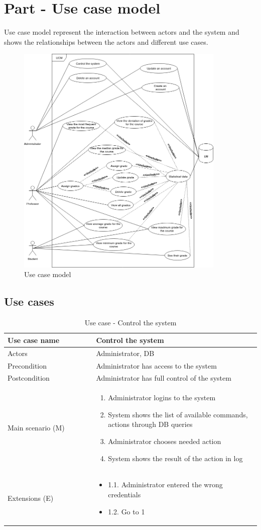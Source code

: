 \documentclass[12pt]{article}
\newcommand\tabularhead[1]{
\begin{table}[h]
  \caption{Use case - #1}
  \begin{tabular}{|p{0.35\linewidth}|p{0.65\linewidth}|}
    \hline
    \textbf{Use case name} & \textbf{#1} \\
    \hline}
\newcommand\addrow[2]{#1 &#2\\ \hline}
\newcommand\adddoublerow[2]{\begin{minipage}[t][][t]{2.5cm}#1\end{minipage}%
    &\begin{minipage}[t][][t]{\linewidth}
     \begin{itemize}\setlength{\itemsep}{0pt}%
        #2     
     \end{itemize}
     \end{minipage}\\ \hline}
\newcommand\addmulrow[2]{ \begin{minipage}[t][][t]{2.5cm}#1\end{minipage}%
     &\begin{minipage}[t][][t]{\linewidth}
      \begin{enumerate}\setlength{\itemsep}{0pt}%
        #2   
      \end{enumerate}
      \end{minipage}\\ \hline}
\newenvironment{usecase}{\tabularhead}
{\hline\end{tabular}\end{table}}
\begin{document}
\section{Part - Use case model}
Use case model represent the interaction between actors and the system and shows the relationships between the actors and different use cases.\cite{UCM}
\begin{figure}[h]
\centering
\includegraphics[width=0.89\textwidth]{UCM.png}
\caption{Use case model}
\end{figure}
\newpage
\subsection{Use cases}

\begin{usecase}{Control the system}
    \addrow{Actors}{Administrator, DB}
    \addrow{Precondition}{Administrator has access to the system}
    \addrow{Postcondition}{Administrator has full control of the system}
    \addmulrow{Main scenario (M)}{
        \item Administrator logins to the system
        \item System shows the list of available commands, actions through DB queries
        \item Administrator chooses needed action
        \item System shows the result of the action in log
    }
    \adddoublerow{Extensions (E)}{
        \item[] 1.1. Administrator entered the wrong credentials
        \item[] 1.2. Go to 1
    }
\end{usecase}
\end{document}
